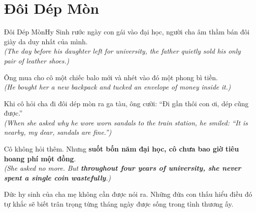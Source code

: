 \section{Đôi Dép Mòn}
\begin{truyen}{Đôi Dép Mòn}{Hy Sinh}
rước ngày con gái vào đại học, người cha âm thầm bán đôi giày da duy nhất của mình.\\
\textit{(The day before his daughter left for university, the father quietly sold his only pair of leather shoes.)}

Ông mua cho cô một chiếc balo mới và nhét vào đó một phong bì tiền.\\
\textit{(He bought her a new backpack and tucked an envelope of money inside it.)}

Khi cô hỏi cha đi đôi dép mòn ra ga tàu, ông cười: ``Đi gần thôi con ơi, dép cũng được.''\\
\textit{(When she asked why he wore worn sandals to the train station, he smiled: ``It is nearby, my dear, sandals are fine.'')}

Cô không hỏi thêm. Nhưng \textbf{suốt bốn năm đại học, cô chưa bao giờ tiêu hoang phí một đồng}.\\
\textit{(She asked no more. But \textbf{throughout four years of university, she never spent a single coin wastefully}.)}
\end{truyen}
\begin{baihoc}
  Đức hy sinh của cha mẹ không cần được nói ra. Những đứa con thấu hiểu điều đó tự khắc sẽ biết trân trọng từng tháng ngày được sống trong tình thương ấy.
\end{baihoc}


